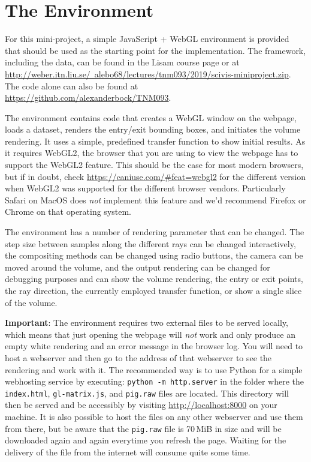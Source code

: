 \documentclass{labinstructions}
\begin{document}
\section{The Environment}
For this mini-project, a simple JavaScript + WebGL environment is provided that should be used as the starting point for the implementation.  The framework, including the data, can be found in the Lisam course page or at \href{http://weber.itn.liu.se/~alebo68/lectures/tnm093/2019/scivis-miniproject.zip}{http://weber.itn.liu.se/~alebo68/lectures/tnm093/2019/scivis-miniproject.zip}.  The code alone can also be found at \href{https://github.com/alexanderbock/TNM093}{https://github.com/alexanderbock/TNM093}.

The environment contains code that creates a WebGL window on the webpage, loads a dataset, renders the entry/exit bounding boxes, and initiates the volume rendering.  It uses a simple, predefined transfer function to show initial results.  As it requires WebGL2, the browser that you are using to view the webpage has to support the WebGL2 feature.  This should be the case for most modern browsers, but if in doubt, check \href{https://caniuse.com/\#feat=webgl2}{https://caniuse.com/\#feat=webgl2} for the different version when WebGL2 was supported for the different browser vendors.  Particularly Safari on MacOS does \emph{not} implement this feature and we'd recommend Firefox or Chrome on that operating system.

The environment has a number of rendering parameter that can be changed.  The step size between samples along the different rays can be changed interactively, the compositing methods can be changed using radio buttons, the camera can be moved around the volume, and the output rendering can be changed for debugging purposes and can show the volume rendering, the entry or exit points, the ray direction, the currently employed transfer function, or show a single slice of the volume.

\textbf{Important}: The environment requires two external files to be served locally, which means that just opening the webpage will \emph{not} work and only produce an empty white rendering and an error message in the browser log.  You will need to host a webserver and then go to the address of that webserver to see the rendering and work with it.  The recommended way is to use Python for a simple webhosting service by executing: \texttt{python -m http.server} in the folder where the \texttt{index.html}, \texttt{gl-matrix.js}, and \texttt{pig.raw} files are located.  This directory will then be served and be accessibly by visiting \href{http://localhost:8000}{http://localhost:8000} on your machine.  It is also possible to host the files on any other webserver and use them from there, but be aware that the \texttt{pig.raw} file is 70\,MiB in size and will be downloaded again and again everytime you refresh the page.  Waiting for the delivery of the file from the internet will consume quite some time.
\end{document}
